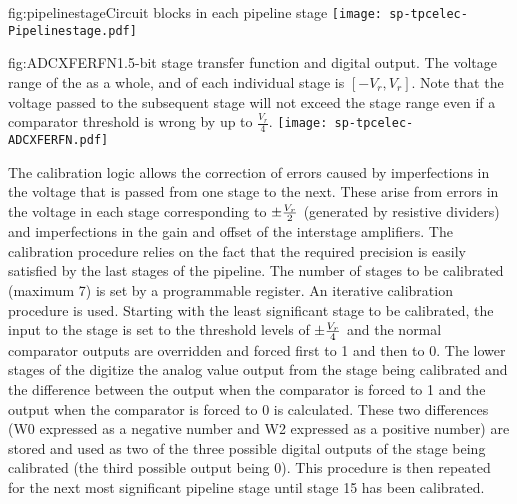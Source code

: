 \begin{dunefigure}{fig:pipelinestage}{Circuit blocks in each  pipeline stage}
\texttt{[image: sp-tpcelec-Pipelinestage.pdf]}
\end{dunefigure}

\begin{dunefigure}{fig:ADCXFERFN}{1.5-bit stage transfer function and digital output. The voltage range of the  as a whole, and of each individual stage is $[-V_r,V_r]$.  Note that the voltage passed to the subsequent stage will not exceed the stage range even if a comparator threshold is wrong by up to $\frac{V_r}{4}$.}
\texttt{[image: sp-tpcelec-ADCXFERFN.pdf]}
\end{dunefigure}

The calibration logic allows the correction of errors caused by imperfections
in the voltage that is passed from one stage to the next.  These arise from
errors in the voltage in each stage corresponding to $\pm{V_{r}\over{2}}$
(generated by resistive dividers) and imperfections in the gain and offset of
the interstage amplifiers.  The calibration procedure relies on the fact that
the required precision is easily satisfied by the last stages of the pipeline.
The number of stages to be calibrated (maximum 7) is set by a programmable
register.  An iterative calibration procedure is used.  Starting with the least
significant stage to be calibrated, the input to the stage is set to the threshold
levels of $\pm{V_{r}\over{4}}$ and the normal comparator outputs are overridden
and forced first to 1 and then to 0.  The lower stages of the  digitize
the analog value output from the stage being calibrated and the difference between
the  output when the comparator is forced to 1 and the 
output when the comparator is forced to 0 is calculated.  These two differences
(W0 expressed as a negative number and W2 expressed as a positive number) are
stored and used as two of the three possible digital outputs of the stage being
calibrated (the third possible output being 0).  This procedure is then repeated
for the next most significant pipeline stage until stage 15 has been calibrated.

